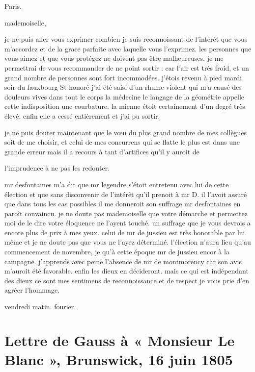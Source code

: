 \documentclass[11pt,a4paper]{article}
\begin{document}
Paris.


mademoiselle,

je ne puis aller vous exprimer combien je suis reconnoissant de l'intérêt que
vous m'accordez et de la grace parfaite avec laquelle vous l'exprimez. les
personnes que vous aimez et que vous protégez ne doivent pas être
malheureuses. je me permettrai de vous recommander de ne point sortir : car
l'air est très froid, et un grand nombre de personnes sont fort incommodées.
j'étois revenu à pied mardi soir du fauxbourg St honoré j'ai été saisi d'un
rhume violent qui m'a causé des douleurs vives dans tout le corps la médecine
 le langage de la géométrie appelle cette indisposition
une courbature. la mienne étoit certainement d'un degré très élevé. enfin elle
a cessé entièrement et j'ai pu sortir.

je ne puis douter maintenant que le vœu du plus grand nombre de mes collègues
soit de me choisir, et celui de mes concurrens qui se flatte le plus est dans
une grande erreur mais il a recours à tant d'artifices qu'il y auroit de

l'imprudence à ne pas les redouter.

mr desfontaines m'a dit que mr legendre s'étoit entretenu avec lui de cette
élection et que sans disconvenir de l'intérêt qu'il prenoit à mr D. il l'avoit
assuré que dans tous les cas possibles il me donneroit son suffrage mr
desfontaines en paroît convaincu. je ne doute pas mademoiselle que votre
démarche et permettez moi de le dire votre éloquence ne l'ayent touché. un
suffrage que je vous devrois a encore plus de prix à mes yeux. celui de mr de
jussieu est très honorable par lui même et je ne doute pas que vous ne l'ayez
déterminé. l'élection n'aura lieu qu'au commencement de novembre, je
 qu'à cette époque mr de jussieu  encor à
la campagne. j'apprends avec peine l'absence de mr de montmorency car son avis
m'auroit été favorable. enfin les dieux en décideront. mais ce qui est
indépendant des dieux ce sont mes sentimens de reconnoissance et de respect
je vous prie d'en agréer l'hommage.


vendredi matin. fourier.

\section{Lettre de Gauss à « Monsieur Le Blanc », Brunswick, 16 juin 1805}
\end{document}
